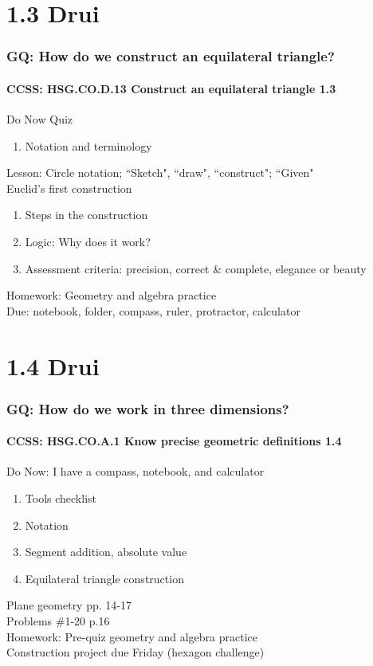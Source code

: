 \documentclass{beamer}
\begin{document}
\section{1.3 Drui}
\frame
{
  \frametitle{GQ: How do we construct an equilateral triangle?}
  \framesubtitle{CCSS: HSG.CO.D.13 Construct an equilateral triangle \qquad \alert{1.3}}

  \begin{block}{Do Now Quiz}
  \begin{enumerate}
      \item Notation and terminology
  \end{enumerate}
  \end{block}
  Lesson: Circle notation; ``Sketch", ``draw", ``construct"; ``Given"\\[5pt]
  Euclid's first construction
  \begin{enumerate}
      \item Steps in the construction
      \item Logic: Why does it work?
      \item Assessment criteria: precision, correct \& complete, elegance or beauty
  \end{enumerate}
  \vspace{0.5cm}
  Homework: Geometry and algebra practice\\
  Due: notebook, folder, compass, ruler, protractor, calculator
}

\section{1.4 Drui}
\frame
{
  \frametitle{GQ: How do we work in three dimensions?}
  \framesubtitle{CCSS: HSG.CO.A.1 Know precise geometric definitions  \alert{1.4}}

  \begin{block}{Do Now: I have a compass, notebook, and calculator}
  \begin{enumerate}
      \item Tools checklist
      \item Notation
      \item Segment addition, absolute value
      \item Equilateral triangle construction
  \end{enumerate}
  \end{block}
  Plane geometry pp. 14-17\\ Problems \#1-20 p.16\\
  \vspace{0.5cm}
  Homework: Pre-quiz geometry and algebra practice\\
  Construction project due Friday (hexagon challenge)
}
\end{document}
